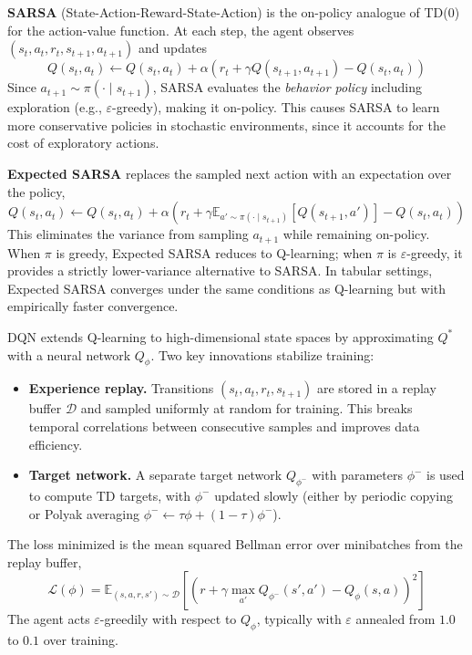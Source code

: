 \documentclass[11pt, letterpaper]{article}
\begin{document}
\begin{concept}
    \textbf{SARSA} (State-Action-Reward-State-Action) is the on-policy analogue of TD(0) for the action-value function. At each step, the agent observes \((s_t, a_t, r_t, s_{t+1}, a_{t+1})\) and updates
    \[
        Q(s_t, a_t) \leftarrow Q(s_t, a_t) + \alpha \left( r_t + \gamma Q(s_{t+1}, a_{t+1}) - Q(s_t, a_t) \right)
    \]
    Since \(a_{t+1} \sim \pi(\cdot \mid s_{t+1})\), SARSA evaluates the \textit{behavior policy} including exploration (e.g., \(\varepsilon\)-greedy), making it on-policy. This causes SARSA to learn more conservative policies in stochastic environments, since it accounts for the cost of exploratory actions.

    \textbf{Expected SARSA} replaces the sampled next action with an expectation over the policy,
    \[
        Q(s_t, a_t) \leftarrow Q(s_t, a_t) + \alpha \left( r_t + \gamma \mathbb{E}_{a' \sim \pi(\cdot \mid s_{t+1})}[Q(s_{t+1}, a')] - Q(s_t, a_t) \right)
    \]
    This eliminates the variance from sampling \(a_{t+1}\) while remaining on-policy. When \(\pi\) is greedy, Expected SARSA reduces to Q-learning; when \(\pi\) is \(\varepsilon\)-greedy, it provides a strictly lower-variance alternative to SARSA. In tabular settings, Expected SARSA converges under the same conditions as Q-learning but with empirically faster convergence.
\end{concept}

\begin{concept}
    DQN extends Q-learning to high-dimensional state spaces by approximating \(Q^*\) with a neural network \(Q_\phi\). Two key innovations stabilize training:
    \begin{itemize}
        \item \textbf{Experience replay.} Transitions \((s_t, a_t, r_t, s_{t+1})\) are stored in a replay buffer \(\mathcal{D}\) and sampled uniformly at random for training. This breaks temporal correlations between consecutive samples and improves data efficiency.
        \item \textbf{Target network.} A separate target network \(Q_{\phi^-}\) with parameters \(\phi^-\) is used to compute TD targets, with \(\phi^-\) updated slowly (either by periodic copying or Polyak averaging \(\phi^- \leftarrow \tau \phi + (1 - \tau)\phi^-\)).
    \end{itemize}
    The loss minimized is the mean squared Bellman error over minibatches from the replay buffer,
    \[
        \mathcal{L}(\phi) = \mathbb{E}_{(s,a,r,s') \sim \mathcal{D}} \left[ \left( r + \gamma \max_{a'} Q_{\phi^-}(s', a') - Q_\phi(s, a) \right)^2 \right]
    \]
    The agent acts \(\varepsilon\)-greedily with respect to \(Q_\phi\), typically with \(\varepsilon\) annealed from \(1.0\) to \(0.1\) over training.
\end{concept}
\end{document}
